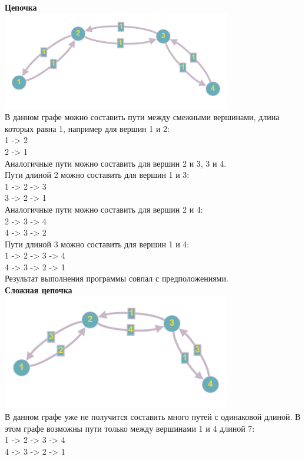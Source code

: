 \documentclass[a4paper,14pt]{extarticle}
\begin{document}
\begin{enumerate}[1.]
        \textbf{Цепочка}\\
        \includegraphics[width=100mm]{testChain}\\
        В данном графе можно составить пути между смежными вершинами, длина которых равна 1, например для вершин 1 и 2:\\
        1 -> 2\\
        2 -> 1\\
        Аналогичные пути можно составить для вершин 2 и 3, 3 и 4.\\
        Пути длиной 2 можно составить для вершин 1 и 3:\\
        1 -> 2 -> 3\\
        3 -> 2 -> 1\\
        Аналогичные пути можно составить для вершин 2 и 4:\\
        2 -> 3 -> 4\\
        4 -> 3 -> 2\\
        Пути длиной 3 можно составить для вершин 1 и 4:\\
        1 -> 2 -> 3 -> 4\\
        4 -> 3 -> 2 -> 1\\ 

        Результат выполнения программы совпал с предположениями.\\

        \textbf{Сложная цепочка}\\
        \includegraphics[width=100mm]{testHardChain}\\
        В данном графе уже не получится составить много путей с одинаковой длиной. В этом графе
        возможны пути только между вершинами 1 и 4 длиной 7:\\
        1 -> 2 -> 3 -> 4\\
        4 -> 3 -> 2 -> 1\\ 


\end{enumerate}
\end{document}
